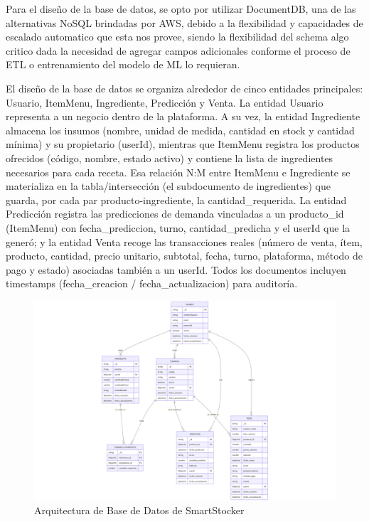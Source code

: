 Para el diseño de la base de datos, se opto por utilizar DocumentDB, una de las alternativas NoSQL brindadas por AWS, debido a la flexibilidad y capacidades de escalado automatico que esta nos provee, siendo la flexibilidad del schema algo critico dada la necesidad de agregar campos adicionales conforme el proceso de ETL o entrenamiento del modelo de ML lo requieran.

El diseño de la base de datos se organiza alrededor de cinco entidades principales: Usuario, ItemMenu, Ingrediente, Predicción y Venta. La entidad Usuario representa a un negocio dentro de la plataforma. A su vez, la entidad Ingrediente almacena los insumos (nombre, unidad de medida, cantidad en stock y cantidad mínima) y su propietario (userId), mientras que ItemMenu registra los productos ofrecidos (código, nombre, estado activo) y contiene la lista de ingredientes necesarios para cada receta. Esa relación N:M entre ItemMenu e Ingrediente se materializa en la tabla/intersección (el subdocumento de ingredientes) que guarda, por cada par producto-ingrediente, la cantidad\_requerida. La entidad Predicción registra las predicciones de demanda vinculadas a un producto\_id (ItemMenu) con fecha\_prediccion, turno, cantidad\_predicha y el userId que la generó; y la entidad Venta recoge las transacciones reales (número de venta, ítem, producto, cantidad, precio unitario, subtotal, fecha, turno, plataforma, método de pago y estado) asociadas también a un userId. Todos los documentos incluyen timestamps (fecha\_creacion / fecha\_actualizacion) para auditoría.

\begin{figure}[htbp]
    \centering
    \includegraphics[width=1\textwidth]{images/arquitectura-base-datos.png}
    \caption{Arquitectura de Base de Datos de SmartStocker}
    \label{fig:arquitectura-base-datos}
\end{figure}

